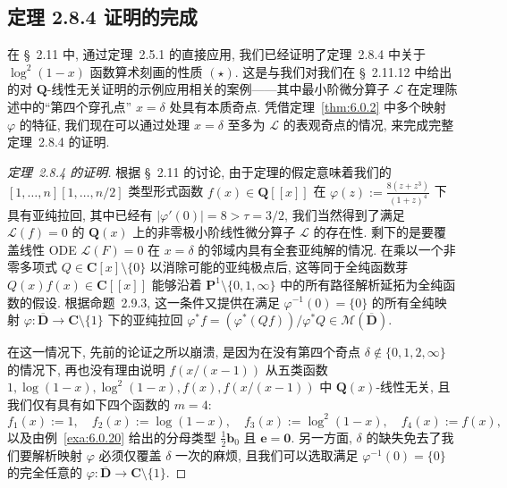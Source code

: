 \subsection{定理 2.8.4 证明的完成}\label{sec:6.8}

在 \S~2.11 中, 通过定理~2.5.1 的直接应用, 我们已经证明了定理~2.8.4 中关于 $\log^2(1-x)$ 函数算术刻画的性质 $(\star)$.
这是与我们对我们在 \S~2.11.12 中给出的对 $\mathbf{Q}$-线性无关证明的示例应用相关的案例——其中最小阶微分算子 $\mathcal{L}$ 在定理陈述中的``第四个穿孔点'' $x = \delta$ 处具有本质奇点.
凭借定理~\ref{thm:6.0.2} 中多个映射 $\varphi$ 的特征, 我们现在可以通过处理 $x = \delta$ 至多为 $\mathcal{L}$ 的表观奇点的情况, 来完成完整定理~2.8.4 的证明.

\begin{proof}[定理~2.8.4 的证明]
根据 \S~2.11 的讨论, 由于定理的假定意味着我们的 $[1,\ldots,n][1,\ldots,n/2]$ 类型形式函数 $f(x)\in \mathbf{Q}[\![x]\!]$ 在 $\varphi(z):=\frac{8(z+z^3)}{(1+z)^4}$ 下具有亚纯拉回, 其中已经有 $|\varphi'(0)|=8>\tau=3/2$, 我们当然得到了满足 $\mathcal{L}(f)=0$ 的 $\mathbf{Q}(x)$ 上的非零极小阶线性微分算子 $\mathcal{L}$ 的存在性.
剩下的是要覆盖线性 ODE $\mathcal{L}(F)=0$ 在 $x=\delta$ 的邻域内具有全套亚纯解的情况.
在乘以一个非零多项式 $Q\in\mathbf{C}[x]\setminus\{0\}$ 以消除可能的亚纯极点后, 这等同于全纯函数芽 $Q(x)f(x)\in\mathbf{C}[\![x]\!]$ 能够沿着 $\mathbf{P}^1\setminus\{0,1,\infty\}$ 中的所有路径解析延拓为全纯函数的假设.
根据命题~2.9.3, 这一条件又提供在满足 $\varphi^{-1}(0)=\{0\}$ 的所有全纯映射 $\varphi:\overline{\mathbf{D}}\to\mathbf{C}\setminus\{1\}$ 下的亚纯拉回 $\varphi^*f=(\varphi^*(Qf))/\varphi^*Q\in\mathcal{M}(\overline{\mathbf{D}})$.

在这一情况下, 先前的论证之所以崩溃, 是因为在没有第四个奇点 $\delta \notin \{0,1,2,\infty\}$ 的情况下, 再也没有理由说明 $f(x/(x-1))$ 从五类函数 $1, \log(1-x), \log^2(1-x), f(x), f(x/(x-1))$ 中 $\mathbf{Q}(x)$-线性无关, 且我们仅有具有如下四个函数的 $m=4$:
\begin{equation}\label{eq:6.8.1}
f_1(x) := 1, \quad f_2(x) := \log(1-x), \quad f_3(x) := \log^2(1-x), \quad f_4(x) := f(x),
\end{equation}
以及由例~\ref{exa:6.0.20} 给出的分母类型 $\frac{1}{2}\mathbf{b}_0$ 且 $\mathbf{e} = \mathbf{0}$.
另一方面, $\delta$ 的缺失免去了我们要解析映射 $\varphi$ 必须仅覆盖 $\delta$ 一次的麻烦, 且我们可以选取满足 $\varphi^{-1}(0) = \{0\}$ 的完全任意的 $\varphi : \overline{\mathbf{D}} \to \mathbf{C} \setminus \{1\}$.


\end{proof}
